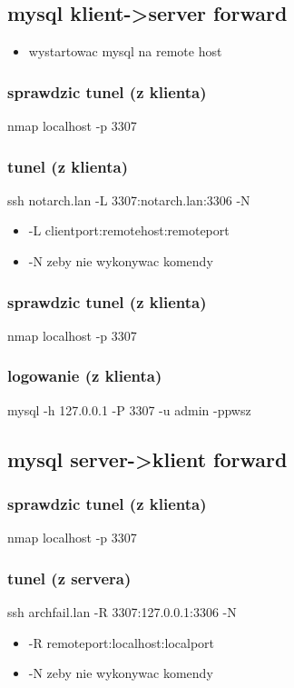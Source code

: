 \documentclass[11pt]{article}
\begin{document}
\subsection{mysql klient->server forward}
\label{sec:org1129b8a}
\begin{itemize}
\item wystartowac mysql na remote host
\end{itemize}
\subsubsection{sprawdzic tunel (z klienta)}
\label{sec:org51a08a9}
nmap localhost -p 3307
\subsubsection{tunel (z klienta)}
\label{sec:org37912fe}
ssh notarch.lan -L 3307:notarch.lan:3306 -N
\begin{itemize}
\item -L clientport:remotehost:remoteport
\item -N zeby nie wykonywac komendy
\end{itemize}
\subsubsection{sprawdzic tunel (z klienta)}
\label{sec:orga27f422}
nmap localhost -p 3307
\subsubsection{logowanie  (z klienta)}
\label{sec:orgee9627b}
mysql -h 127.0.0.1 -P 3307 -u admin -ppwsz
\subsection{mysql server->klient forward}
\label{sec:org7cc4362}
\subsubsection{sprawdzic tunel (z klienta)}
\label{sec:org9f609c2}
nmap localhost -p 3307
\subsubsection{tunel (z servera)}
\label{sec:org10073e8}
ssh archfail.lan -R 3307:127.0.0.1:3306 -N
\begin{itemize}
\item -R remoteport:localhost:localport
\item -N zeby nie wykonywac komendy
\end{itemize}
\end{document}
